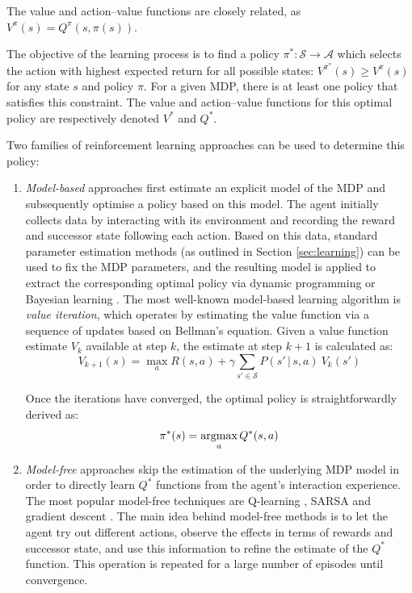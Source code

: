 The value and action--value functions are closely related, as $V^{\pi}(s) = Q^{\pi}(s,\pi(s))$.

The objective of the learning process is to find a policy $\pi^*: \mathcal{S} \rightarrow \mathcal{A}$ which selects the action with highest expected return for all possible states: $V^{\pi^*}(s) \geq V^{\pi}(s)$ for any state $s$ and policy $\pi$.  For a given MDP, there is at least one policy that satisfies this constraint. The value and action--value functions for this optimal policy are respectively denoted $V^*$ and $Q^*$. 

Two families of reinforcement learning approaches can be used to determine this policy: \begin{enumerate}
\item  \textit{Model-based} approaches first estimate an explicit model of the MDP and subsequently optimise a policy based on this model. The agent initially collects data by interacting with its environment and recording the reward and successor state following each action. Based on this data, standard parameter estimation methods (as outlined in Section \ref{sec:learning}) can be used to fix the MDP parameters, and the resulting model is  applied to extract the corresponding optimal policy via dynamic programming \citep{Bertsekas:1996} or Bayesian learning \citep{DeardenFA99}.  The most well-known model-based learning algorithm is \textit{value iteration}, which operates by estimating the value function via a sequence of updates based on Bellman's equation. Given a value function estimate $V_k$ available at step $k$, the estimate at step $k+1$ is calculated as: 
\begin{equation}
V_{k+1}(s) = \max_a R(s,a) + \gamma \sum_{s' \in \mathcal{S}} P(s' \, | \, s, a) \ V_k(s')
\end{equation}

Once the iterations have converged, the optimal policy is straightforwardly derived as:
\begin{equation}
\pi^*(s) = \argmax_a Q^*(s,a)
\end{equation}

\item \textit{Model-free} approaches skip the estimation of the underlying MDP model in order to directly learn $Q^*$ functions from the agent's interaction experience.  The most popular model-free techniques are Q-learning \citep{watkins92}, SARSA \citep{rummery:phd95} and gradient descent \citep{Sutton:2009}.  The main idea behind model-free methods is to let the agent try out different actions, observe the effects in terms of rewards and successor state, and use this information to refine the estimate of the $Q^*$ function. This operation is repeated for a large number of episodes until convergence.  
\end{enumerate}

